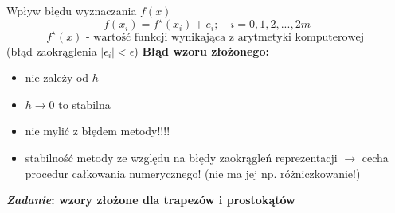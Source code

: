 	\begin{frame}{Wpływ błędu wyznaczania $f(x)$}
        $$
        f(x_{i})=f^{\star}(x_{i})+e_{i};\quad i=0, 1, 2, . . ., 2m
        $$
		$$
        f^{\star}(x) \textrm{ - wartość funkcji wynikająca z arytmetyki komputerowej }
        $$
        (błąd zaokrąglenia $|\epsilon_{i}|<\epsilon$)
        \newline
        \newline
		\textbf{Błąd wzoru złożonego:}
        \begin{itemize}
        \item nie zależy od $h$
        
		\item $h\rightarrow 0$ to stabilna
        
		\item nie mylić z błędem metody!!!!
        
		\item stabilność metody ze względu na błędy zaokrągleń reprezentacji $\rightarrow$ cecha procedur całkowania numerycznego! (nie ma jej np. różniczkowanie!)
		\end{itemize}
		\textbf{{\it Zadanie}: wzory złożone dla trapezów i prostokątów}
        
    \end{frame}
